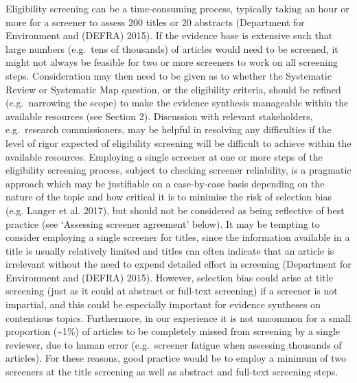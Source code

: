 \documentclass[
  letterpaper,
  DIV=11,
  numbers=noendperiod]{scrreprt}
\begin{document}
Eligibility screening can be a time-consuming process, typically taking
an hour or more for a screener to assess 200 titles or 20 abstracts
(Department for Environment and (DEFRA) 2015). If the evidence base is
extensive such that large numbers (e.g.~tens of thousands) of articles
would need to be screened, it might not always be feasible for two or
more screeners to work on all screening steps. Consideration may then
need to be given as to whether the Systematic Review or Systematic Map
question, or the eligibility criteria, should be refined (e.g.~narrowing
the scope) to make the evidence synthesis manageable within the
available resources (see Section 2). Discussion with relevant
stakeholders, e.g.~research commissioners, may be helpful in resolving
any difficulties if the level of rigor expected of eligibility screening
will be difficult to achieve within the available resources. Employing a
single screener at one or more steps of the eligibility screening
process, subject to checking screener reliability, is a pragmatic
approach which may be justifiable on a case-by-case basis depending on
the nature of the topic and how critical it is to minimise the risk of
selection bias (e.g. Langer et al. 2017), but should not be considered
as being reflective of best practice (see `Assessing screener agreement'
below). It may be tempting to consider employing a single screener for
titles, since the information available in a title is usually relatively
limited and titles can often indicate that an article is irrelevant
without the need to expend detailed effort in screening (Department for
Environment and (DEFRA) 2015). However, selection bias could arise at
title screening (just as it could at abstract or full-text screening) if
a screener is not impartial, and this could be especially important for
evidence syntheses on contentious topics. Furthermore, in our experience
it is not uncommon for a small proportion (\textasciitilde1\%) of
articles to be completely missed from screening by a single reviewer,
due to human error (e.g.~screener fatigue when assessing thousands of
articles). For these reasons, good practice would be to employ a minimum
of two screeners at the title screening as well as abstract and
full-text screening steps.
\end{document}
